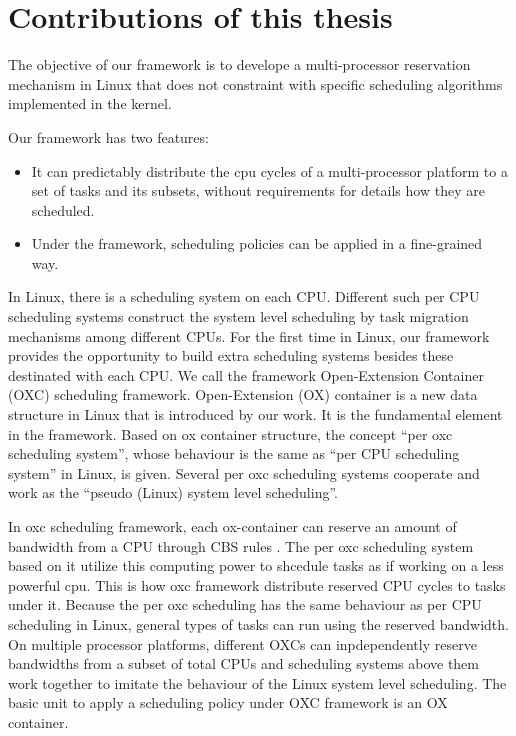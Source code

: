 \section{Contributions of this thesis}

The objective of our framework is to develope a multi-processor reservation
mechanism in Linux that does not constraint with specific scheduling 
algorithms implemented in the kernel.

%
%

Our framework has two features:
\begin{itemize}
\item It can predictably distribute the cpu cycles of a
  multi-processor platform to a set of tasks and its subsets, without
  requirements for details how they are scheduled.
\item Under the framework, scheduling policies can be applied in a
  fine-grained way.
\end{itemize}


%
%
In Linux, there is a scheduling system on each CPU. Different such per
CPU scheduling systems construct the system level scheduling by task
migration mechanisms among different CPUs. For the first time in
Linux, our framework provides the opportunity to build extra
scheduling systems besides these destinated with each CPU. We call the
framework Open-Extension Container (OXC) scheduling
framework. Open-Extension (OX) container is a new data structure in
Linux that is introduced by our work.  It is the fundamental element
in the framework. Based on ox container structure, the concept ``per
oxc scheduling system'', whose behaviour is the same as ``per CPU
scheduling system'' in Linux, is given. Several per oxc scheduling
systems cooperate and work as the ``pseudo (Linux) system level
scheduling''.

In oxc scheduling framework, each ox-container can reserve an amount
of bandwidth from a CPU through CBS rules \cite{AbeniB98}. The per oxc
scheduling system based on it utilize this computing power to shcedule
tasks as if working on a less powerful cpu. This is how oxc framework
distribute reserved CPU cycles to tasks under it. Because the per oxc
scheduling has the same behaviour as per CPU scheduling in Linux,
general types of tasks can run using the reserved bandwidth. On
multiple processor platforms, different OXCs can inpdependently
reserve bandwidths from a subset of total CPUs and scheduling systems
above them work together to imitate the behaviour of the Linux system
level scheduling. The basic unit to apply a scheduling policy under
OXC framework is an OX container.

